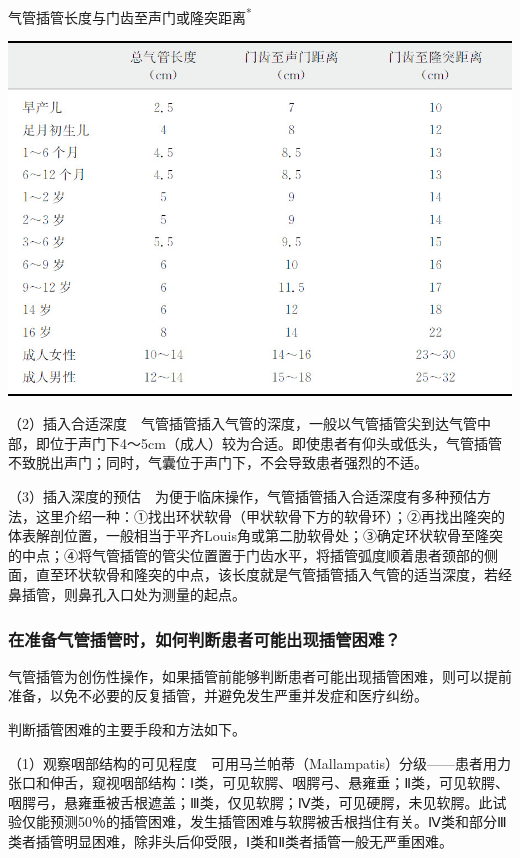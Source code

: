 \begin{table}[htbp]
\centering
\caption{气管插管长度与门齿至声门或隆突距离\textsuperscript{*}}
\label{tab9-2}
\includegraphics{./images/Image00076.jpg}
\end{table}

（2）插入合适深度　气管插管插入气管的深度，一般以气管插管尖到达气管中部，即位于声门下4～5cm（成人）较为合适。即使患者有仰头或低头，气管插管不致脱出声门；同时，气囊位于声门下，不会导致患者强烈的不适。

（3）插入深度的预估　为便于临床操作，气管插管插入合适深度有多种预估方法，这里介绍一种：①找出环状软骨（甲状软骨下方的软骨环）；②再找出隆突的体表解剖位置，一般相当于平齐Louis角或第二肋软骨处；③确定环状软骨至隆突的中点；④将气管插管的管尖位置置于门齿水平，将插管弧度顺着患者颈部的侧面，直至环状软骨和隆突的中点，该长度就是气管插管插入气管的适当深度，若经鼻插管，则鼻孔入口处为测量的起点。

\subsubsection{在准备气管插管时，如何判断患者可能出现插管困难？}

气管插管为创伤性操作，如果插管前能够判断患者可能出现插管困难，则可以提前准备，以免不必要的反复插管，并避免发生严重并发症和医疗纠纷。

判断插管困难的主要手段和方法如下。

（1）观察咽部结构的可见程度　可用马兰帕蒂（Mallampatis）分级------患者用力张口和伸舌，窥视咽部结构：Ⅰ类，可见软腭、咽腭弓、悬雍垂；Ⅱ类，可见软腭、咽腭弓，悬雍垂被舌根遮盖；Ⅲ类，仅见软腭；Ⅳ类，可见硬腭，未见软腭。此试验仅能预测50％的插管困难，发生插管困难与软腭被舌根挡住有关。Ⅳ类和部分Ⅲ类者插管明显困难，除非头后仰受限，Ⅰ类和Ⅱ类者插管一般无严重困难。

